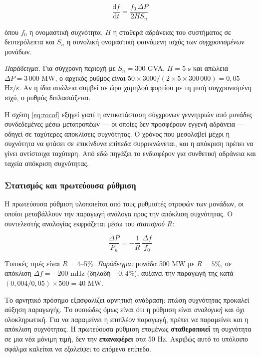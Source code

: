 \begin{equation}
\frac{\mathrm{d}f}{\mathrm{d}t} = \frac{f_0 \, \Delta P}{2 H S_n}
\label{eq:rocof}
\end{equation}

όπου $f_0$ η ονομαστική συχνότητα, $H$ η σταθερά αδράνειας του συστήματος σε δευτερόλεπτα
και $S_n$ η συνολική ονομαστική φαινόμενη ισχύς των \emph{συγχρονισμένων} μονάδων.

\emph{Παράδειγμα.} Για σύγχρονη περιοχή με $S_n = 300$ GVA, $H = 5$ s και απώλεια
$\Delta P = 3\,000$ MW, ο αρχικός ρυθμός είναι
$50 \times 3000 / (2 \times 5 \times 300\,000) = 0{,}05$ Hz/s. Αν η ίδια απώλεια συμβεί σε
ώρα χαμηλού φορτίου με τη μισή συγχρονισμένη ισχύ, ο ρυθμός διπλασιάζεται.

Η σχέση \eqref{eq:rocof} εξηγεί γιατί η αντικατάσταση σύγχρονων γεννητριών από μονάδες
συνδεδεμένες μέσω μετατροπέων — οι οποίες δεν προσφέρουν εγγενή αδράνεια — οδηγεί σε
ταχύτερες αποκλίσεις συχνότητας. Ο χρόνος που μεσολαβεί μέχρι η συχνότητα να φτάσει σε
επικίνδυνα επίπεδα συρρικνώνεται, και η απόκριση πρέπει να γίνει αντίστοιχα ταχύτερη. Από
εδώ πηγάζει το ενδιαφέρον για συνθετική αδράνεια και ταχεία απόκριση συχνότητας.

\subsubsection*{Στατισμός και πρωτεύουσα ρύθμιση}

Η πρωτεύουσα ρύθμιση υλοποιείται από τους ρυθμιστές στροφών των μονάδων, οι οποίοι
μεταβάλλουν την παραγωγή ανάλογα προς την απόκλιση συχνότητας. Ο συντελεστής αναλογίας
εκφράζεται μέσω του \emph{στατισμού} $R$:

\begin{equation}
\frac{\Delta P}{P_n} = -\frac{1}{R}\,\frac{\Delta f}{f_0}
\label{eq:droop}
\end{equation}

Τυπικές τιμές είναι $R = 4$--5\%. \emph{Παράδειγμα:} μονάδα 500 MW με $R = 5\%$, σε
απόκλιση $\Delta f = -200$ mHz (δηλαδή $-0{,}4\%$), αυξάνει την παραγωγή της κατά
$(0{,}004/0{,}05) \times 500 = 40$ MW.

Το αρνητικό πρόσημο εξασφαλίζει αρνητική ανάδραση: πτώση συχνότητας προκαλεί αύξηση
παραγωγής. Το ουσιώδες όμως είναι ότι η ρύθμιση είναι \emph{αναλογική} και όχι
ολοκληρωτική. Για να παραμείνει η επιπλέον παραγωγή, πρέπει να παραμείνει και η απόκλιση
συχνότητας. Η πρωτεύουσα ρύθμιση επομένως \textbf{σταθεροποιεί} τη συχνότητα σε μια νέα
μόνιμη τιμή, δεν την \textbf{επαναφέρει} στα 50 Hz. Ακριβώς αυτό το υπόλοιπο σφάλμα καλείται
να εξαλείψει το επόμενο επίπεδο.

